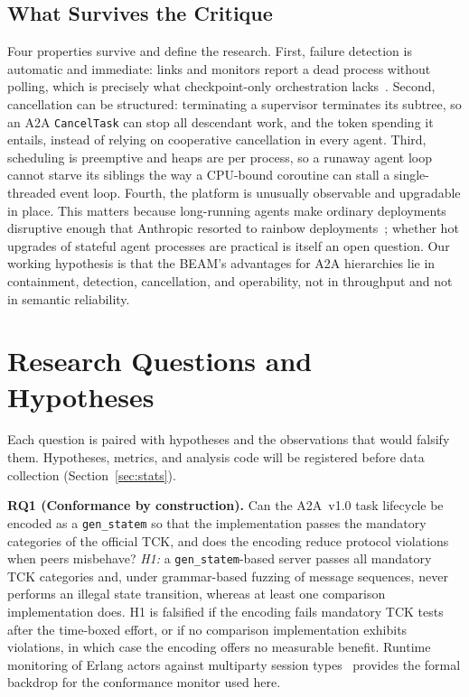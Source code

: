 \documentclass[conference,letterpaper]{IEEEtran}
\newcommand{\code}[1]{\texttt{#1}}
\newcommand{\gsm}{\code{gen\_statem}}
\begin{document}
\subsection{What Survives the Critique}\label{sec:survives}

Four properties survive and define the research. First, failure detection
is automatic and immediate: links and monitors report a dead process without
polling, which is precisely what checkpoint-only orchestration
lacks~\cite{diagrid2025}. Second, cancellation can be structured:
terminating a supervisor terminates its subtree, so an A2A \code{CancelTask}
can stop all descendant work, and the token spending it entails, instead of
relying on cooperative cancellation in every agent. Third, scheduling is
preemptive and heaps are per process, so a runaway agent loop cannot starve
its siblings the way a CPU-bound coroutine can stall a single-threaded event
loop. Fourth, the platform is unusually observable and upgradable in place.
This matters because long-running agents make ordinary deployments
disruptive enough that Anthropic resorted to rainbow
deployments~\cite{anthropic2025}; whether hot upgrades of stateful agent
processes are practical is itself an open question. Our working hypothesis
is that the BEAM's advantages for A2A hierarchies lie in containment,
detection, cancellation, and operability, not in throughput and not in
semantic reliability.

\section{Research Questions and Hypotheses}\label{sec:rq}

Each question is paired with hypotheses and the observations that would
falsify them. Hypotheses, metrics, and analysis code will be registered
before data collection (Section~\ref{sec:stats}).

\textbf{RQ1 (Conformance by construction).} Can the A2A~v1.0 task lifecycle
be encoded as a \gsm{} so that the implementation passes the mandatory
categories of the official TCK, and does the encoding reduce protocol
violations when peers misbehave? \emph{H1:} a \gsm-based server passes all
mandatory TCK categories and, under grammar-based fuzzing of message
sequences, never performs an illegal state transition, whereas at least one
comparison implementation does. H1 is falsified if the encoding fails
mandatory TCK tests after the time-boxed effort, or if no comparison
implementation exhibits violations, in which case the encoding offers no
measurable benefit. Runtime monitoring of Erlang actors against multiparty
session types~\cite{fowler2016,fowler2026} provides the formal backdrop for
the conformance monitor used here.
\end{document}
